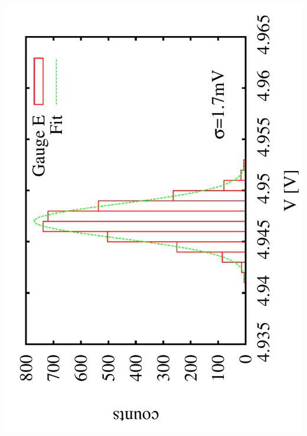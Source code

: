 \documentclass[a4paper,11pt]{book}
\begin{document}
  \includegraphics[scale=0.15,angle=-90]{image_ai_24e1.pdf}\par
\end{document}
